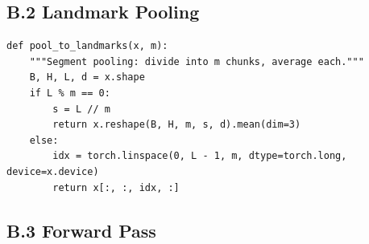 \subsection{B.2 Landmark Pooling}

\begin{lstlisting}
def pool_to_landmarks(x, m):
    """Segment pooling: divide into m chunks, average each."""
    B, H, L, d = x.shape
    if L % m == 0:
        s = L // m
        return x.reshape(B, H, m, s, d).mean(dim=3)
    else:
        idx = torch.linspace(0, L - 1, m, dtype=torch.long, device=x.device)
        return x[:, :, idx, :]
\end{lstlisting}

\subsection{B.3 Forward Pass}

